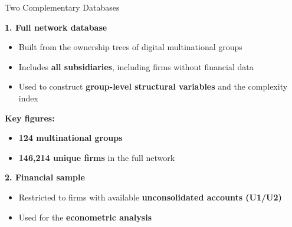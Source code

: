 \documentclass[11pt,aspectratio=169]{beamer}
\begin{document}
\begin{frame}{Two Complementary Databases}

  \textbf{1. Full network database}
  
  \begin{itemize}
      \item Built from the ownership trees of digital multinational groups
      \item Includes \textbf{all subsidiaries}, including firms without financial data
      \item Used to construct \textbf{group-level structural variables} and the complexity index
  \end{itemize}
  
  \medskip
  
  \textbf{Key figures:}
  \begin{itemize}
      \item \textbf{124 multinational groups}
      \item \textbf{146,214 unique firms} in the full network
  \end{itemize}
  
  \medskip
  
  \textbf{2. Financial sample}
  
  \begin{itemize}
      \item Restricted to firms with available \textbf{unconsolidated accounts (U1/U2)}
      \item Used for the \textbf{econometric analysis}
  \end{itemize}
  
  \end{frame}
  
\end{document}
